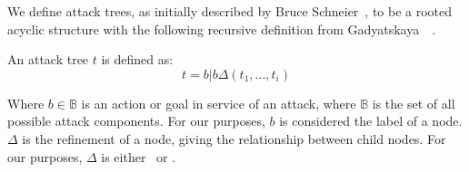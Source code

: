 We define attack trees, as initially described by Bruce Schneier~\cite{schneierAttackTrees1999}, to be a rooted acyclic structure with the following recursive definition  from Gadyatskaya~\etal~\cite{gadyatskayaRefinementAwareGenerationAttack2017}.

\begin{definition} \label{def:attack-tree}

An attack tree $t$ is defined as:
\[
    t = b | b\Delta(t_1, ..., t_i)
\]

Where $b \in \mathbb{B}$ is an action or goal in service of an attack, where $\mathbb{B}$ is the set of all possible attack components. For our purposes, $b$ is considered the label of a node. $\Delta$ is the refinement of a node, giving the relationship between child nodes. For our purposes, $\Delta$ is either \AND\ or \OR.








\end{definition}
